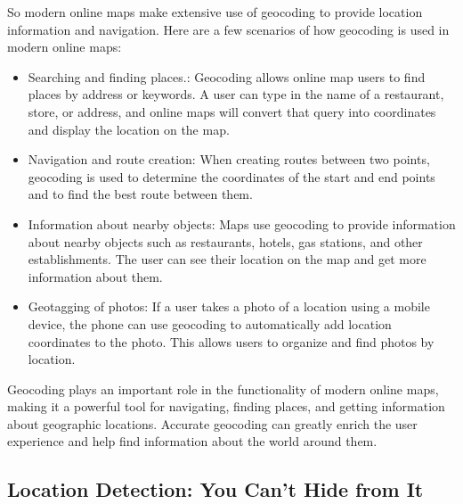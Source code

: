 \documentclass[10pt,oneside,english,a4paper]{article}
\begin{document}
So modern online maps make extensive use of geocoding to provide location information and navigation. Here are a few scenarios of how geocoding is used in modern online maps:

\begin{itemize}
\item Searching and finding places.: Geocoding allows online map users to find places by address or keywords. A user can type in the name of a restaurant, store, or address, and online maps will convert that query into coordinates and display the location on the map.
\item Navigation and route creation: When creating routes between two points, geocoding is used to determine the coordinates of the start and end points and to find the best route between them.
\item Information about nearby objects: Maps use geocoding to provide information about nearby objects such as restaurants, hotels, gas stations, and other establishments. The user can see their location on the map and get more information about them.
\item Geotagging of photos: If a user takes a photo of a location using a mobile device, the phone can use geocoding to automatically add location coordinates to the photo. This allows users to organize and find photos by location.
\end{itemize}

Geocoding plays an important role in the functionality of modern online maps, making it a powerful tool for navigating, finding places, and getting information about geographic locations. Accurate geocoding can greatly enrich the user experience and help find information about the world around them. 

\subsection{Location Detection: You Can't Hide from It} \label{internal:gps}




\end{document}
